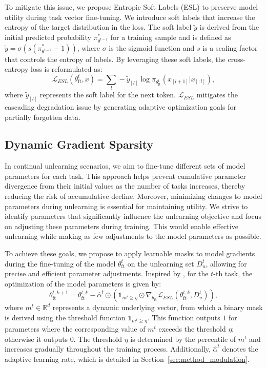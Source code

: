 \documentclass{article}
\theoremstyle{plain}
\theoremstyle{definition}
\theoremstyle{remark}
\begin{document}
To mitigate this issue, we propose Entropic Soft Labels (ESL) to preserve model utility during task vector fine-tuning.
We introduce soft labels that increase the entropy of the target distribution in the loss.
The soft label $\tilde{y}$ is derived from the initial predicted probability $\pi_{\theta^{t-1}}^*$ for a training sample and is defined as $\tilde{y}=\sigma\left(s(\pi_{\theta^{t-1}}^*-1)\right)$, where $\sigma$ is the sigmoid function and $s$ is a scaling factor that controls the entropy of labels.
By leveraging these soft labels, the cross-entropy loss is reformulated as:
\begin{equation}
	\mathcal{L}_{ESL}(\theta^t_\text{ft}, x)=\sum_{l}-\tilde{y}_{[l]}\log{\pi_{\theta^t_\text{ft}}(x_{[l+1]}|x_{[:l]})},
\end{equation}
where $\tilde{y}_{[l]}$ represents the soft label for the next token.
$\mathcal{L}_{ESL}$ mitigates the cascading degradation issue by generating adaptive optimization goals for partially forgotten data.




\subsection{Dynamic Gradient Sparsity}
\label{sec:dynamic_gradient}

In continual unlearning scenarios, we aim to fine-tune different sets of model parameters for each task.
This approach helps prevent cumulative parameter divergence from their initial values as the number of tasks increases, thereby reducing the risk of accumulative decline.
Moreover, minimizing changes to model parameters during unlearning is essential for maintaining utility.
We strive to identify parameters that significantly influence the unlearning objective and focus on adjusting these parameters during training.
This would enable effective unlearning while making as few adjustments to the model parameters as possible.

To achieve these goals, we propose to apply learnable masks to model gradients during the fine-tuning of the model $\theta_{\text{ft}}^{t}$ on the unlearning set $D_u^t$, allowing for precise and efficient parameter adjustments.
Inspired by \citet{DBLP:conf/nips/OswaldZKSCZS21}, for the $t$-th task, the optimization of the model parameters is given by:
\begin{equation}
	\theta_{\text{ft}}^{t,k+1}=\theta_{\text{ft}}^{t,k}-\hat{\alpha}^t\odot(\mathds{1}_{m^t\geq\eta}\odot\nabla_{\theta_{\text{ft}}}\mathcal{L}_{ESL}(\theta_{\text{ft}}^{t,k}, D_u^t)),
	\label{eq:theta}
\end{equation}
where $m^t\in \mathbb{R}^d$ represents a dynamic underlying vector, from which a binary mask is derived using the threshold function $\mathds{1}_{m^t\geq\eta}$. This function outputs $1$ for parameters where the corresponding value of $m^t$ exceeds the threshold $\eta$; otherwise it outputs $0$.
The threshold $\eta$ is determined by the percentile of $m^t$ and increases gradually throughout the training process.
Additionally, $\hat{\alpha}^t$ denotes the adaptive learning rate, which is detailed in Section~\ref{sec:method_modulation}.
\end{document}
